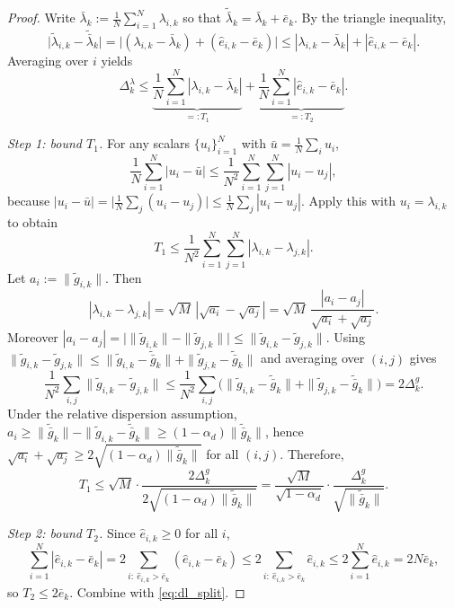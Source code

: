 \documentclass[11pt,a4paper]{article}
\begin{document}
\begin{proof}
	Write $\bar\lambda_k:=\frac1N\sum_{i=1}^N \lambda_{i,k}$ so that
	$\tilde{\bar\lambda}_k=\bar\lambda_k+\bar e_k$.
	By the triangle inequality,
	\[
	\big|\tilde\lambda_{i,k}-\tilde{\bar\lambda}_k\big|
	=
	\big|(\lambda_{i,k}-\bar\lambda_k)+(\hat e_{i,k}-\bar e_k)\big|
	\le
	|\lambda_{i,k}-\bar\lambda_k|+|\hat e_{i,k}-\bar e_k|.
	\]
	Averaging over $i$ yields
	\begin{equation}\label{eq:dl_split}
		\Delta_k^\lambda \le
		\underbrace{\frac1N\sum_{i=1}^N |\lambda_{i,k}-\bar\lambda_k|}_{=:T_1}
		+
		\underbrace{\frac1N\sum_{i=1}^N |\hat e_{i,k}-\bar e_k|}_{=:T_2}.
	\end{equation}
	
	\noindent\emph{Step 1: bound $T_1$.}
	For any scalars $\{u_i\}_{i=1}^N$ with $\bar u=\frac1N\sum_i u_i$,
	\[
	\frac1N\sum_{i=1}^N |u_i-\bar u|
	\le \frac{1}{N^2}\sum_{i=1}^N\sum_{j=1}^N |u_i-u_j|,
	\]
	because $|u_i-\bar u|=\big|\frac1N\sum_j(u_i-u_j)\big|\le \frac1N\sum_j|u_i-u_j|$.
	Apply this with $u_i=\lambda_{i,k}$ to obtain
	\[
	T_1\le \frac{1}{N^2}\sum_{i=1}^N\sum_{j=1}^N |\lambda_{i,k}-\lambda_{j,k}|.
	\]
	Let $a_i:=\|\tilde g_{i,k}\|$. Then
	\[
	|\lambda_{i,k}-\lambda_{j,k}|
	=\sqrt{M}\,|\sqrt{a_i}-\sqrt{a_j}|
	=\sqrt{M}\,\frac{|a_i-a_j|}{\sqrt{a_i}+\sqrt{a_j}}.
	\]
	Moreover $|a_i-a_j|=\big|\|\tilde g_{i,k}\|-\|\tilde g_{j,k}\|\big|\le \|\tilde g_{i,k}-\tilde g_{j,k}\|$.
	Using $\|\tilde g_{i,k}-\tilde g_{j,k}\|\le \|\tilde g_{i,k}-\tilde{\bar g}_k\|+\|\tilde g_{j,k}-\tilde{\bar g}_k\|$ and averaging over $(i,j)$ gives
	\[
	\frac{1}{N^2}\sum_{i,j}\|\tilde g_{i,k}-\tilde g_{j,k}\|
	\le \frac{1}{N^2}\sum_{i,j}\Big(\|\tilde g_{i,k}-\tilde{\bar g}_k\|+\|\tilde g_{j,k}-\tilde{\bar g}_k\|\Big)
	=2\Delta_k^g.
	\]
	Under the relative dispersion assumption,
	$a_i\ge \|\tilde{\bar g}_k\|-\|\tilde g_{i,k}-\tilde{\bar g}_k\|\ge (1-\alpha_d)\|\tilde{\bar g}_k\|$,
	hence $\sqrt{a_i}+\sqrt{a_j}\ge 2\sqrt{(1-\alpha_d)\|\tilde{\bar g}_k\|}$ for all $(i,j)$.
	Therefore,
	\[
	T_1\le
	\sqrt{M}\cdot
	\frac{2\Delta_k^g}{2\sqrt{(1-\alpha_d)\|\tilde{\bar g}_k\|}}
	=
	\frac{\sqrt{M}}{\sqrt{1-\alpha_d}}\cdot
	\frac{\Delta_k^g}{\sqrt{\|\tilde{\bar g}_k\|}}.
	\]
	
	\noindent\emph{Step 2: bound $T_2$.}
	Since $\hat e_{i,k}\ge 0$ for all $i$,
	\[
	\sum_{i=1}^N |\hat e_{i,k}-\bar e_k|
	=
	2\sum_{i:\ \hat e_{i,k}>\bar e_k} (\hat e_{i,k}-\bar e_k)
	\le
	2\sum_{i:\ \hat e_{i,k}>\bar e_k}\hat e_{i,k}
	\le 2\sum_{i=1}^N \hat e_{i,k}=2N\bar e_k,
	\]
	so $T_2\le 2\bar e_k$.
	Combine with \eqref{eq:dl_split}.
\end{proof}
	
\end{document}
